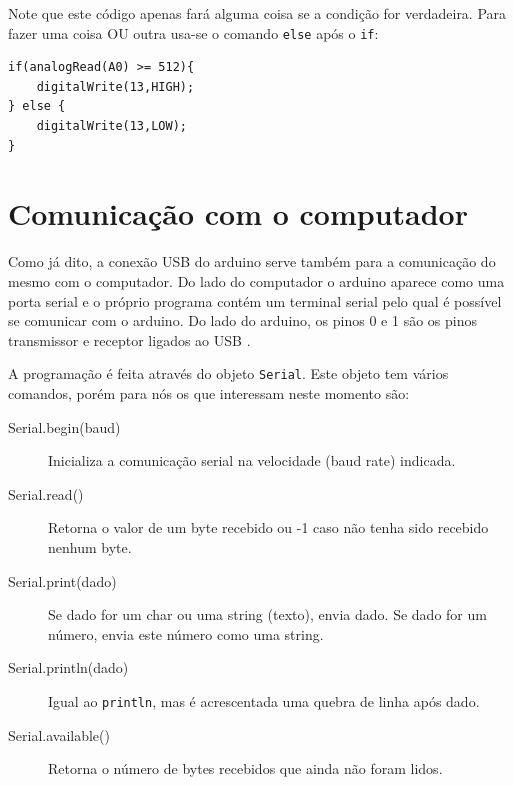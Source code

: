 Note que este código apenas fará alguma coisa se a condição for verdadeira. Para fazer uma coisa OU outra usa-se o comando \lstinline|else| após o \lstinline|if|:
\begin{lstlisting}
if(analogRead(A0) >= 512){
	digitalWrite(13,HIGH);
} else {
	digitalWrite(13,LOW);
}
\end{lstlisting}
\section{Comunicação com o computador}
Como já dito, a conexão USB do arduino serve também para a comunicação do mesmo com o computador. Do lado do computador o arduino aparece como uma porta serial e o próprio programa contém um terminal serial pelo qual é possível se comunicar com o arduino. Do lado do arduino, os pinos 0 e 1 são os pinos transmissor e receptor ligados ao USB .

A programação é feita através do objeto  \lstinline|Serial|. Este objeto tem vários comandos, porém para nós os que interessam neste momento são:
\begin{description}
	\item[Serial.begin(baud)] Inicializa a comunicação serial na velocidade (baud rate) indicada.
	\item[Serial.read()] Retorna o valor de um byte recebido ou -1 caso não tenha sido recebido nenhum byte.
	\item[Serial.print(dado)] Se dado for um char ou uma string (texto), envia dado. Se dado for um número, envia este número como uma string. 
	\item[Serial.println(dado)] Igual ao \lstinline|println|, mas é acrescentada uma quebra de linha após dado.
	\item[Serial.available()] Retorna o número de bytes recebidos que ainda não foram lidos.
\end{description}

